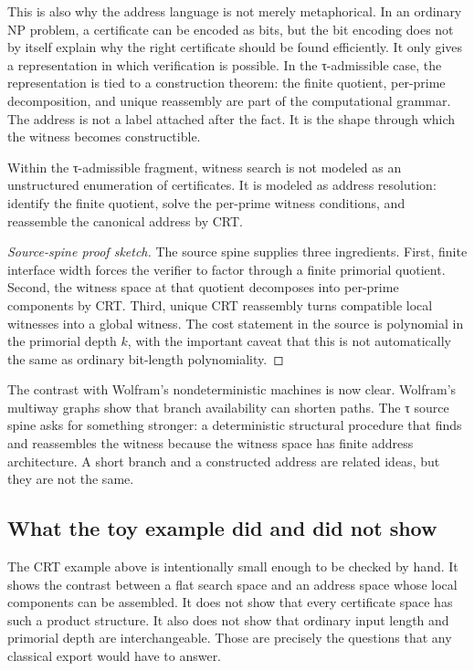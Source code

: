 \documentclass{pantarhei-researchnote}
\begin{document}
This is also why the address language is not merely metaphorical. In an
ordinary NP problem, a certificate can be encoded as bits, but the bit
encoding does not by itself explain why the right certificate should be
found efficiently. It only gives a representation in which verification
is possible. In the τ-admissible case, the representation is tied to a
construction theorem: the finite quotient, per-prime decomposition, and
unique reassembly are part of the computational grammar. The address is
not a label attached after the fact. It is the shape through which the
witness becomes constructible.

\begin{proposition}
Within the τ-admissible fragment, witness search is not modeled as an
unstructured enumeration of certificates. It is modeled as address
resolution: identify the finite quotient, solve the per-prime witness
conditions, and reassemble the canonical address by CRT.
\end{proposition}

\begin{proof}[Source-spine proof sketch]
The source spine supplies three ingredients. First, finite interface width
forces the verifier to factor through a finite primorial quotient. Second,
the witness space at that quotient decomposes into per-prime components by
CRT. Third, unique CRT reassembly turns compatible local witnesses into a
global witness. The cost statement in the source is polynomial in the
primorial depth \(k\), with the important caveat that this is not
automatically the same as ordinary bit-length polynomiality.
\end{proof}

The contrast with Wolfram's nondeterministic machines is now clear.
Wolfram's multiway graphs show that branch availability can shorten paths.
The τ source spine asks for something stronger: a deterministic structural
procedure that finds and reassembles the witness because the witness space
has finite address architecture. A short branch and a constructed address
are related ideas, but they are not the same.

\subsection{What the toy example did and did not show}

The CRT example above is intentionally small enough to be checked by
hand. It shows the contrast between a flat search space and an address
space whose local components can be assembled. It does not show that
every certificate space has such a product structure. It also does not
show that ordinary input length and primorial depth are interchangeable.
Those are precisely the questions that any classical export would have
to answer.
\end{document}
